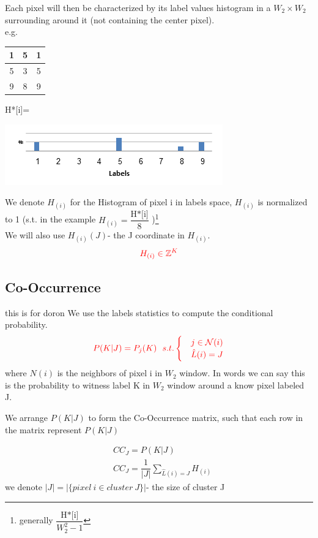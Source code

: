 \documentclass{article}
\begin{document}
Each pixel will then be characterized by its label values histogram in a $W_2\times W_2$ surrounding around it (not containing the center pixel).\\
e.g. 
\begin{multicols}{3}
\begin{tabular}{|c|c|c|}\hline
1&5&1\\	\hline
5&3&5\\ \hline
9&8&9\\ \hline
\end{tabular}

\begin{flushright}
	H*[i]=
\end{flushright}	
\includegraphics[width=0.9\linewidth]{histogram.png}
\end{multicols}
We denote $ H_{(i)} $ for the Histogram of pixel i in labels space, $ H_{(i)} $  is normalized to 1 (s.t. in the example $ H_{(i)} = \dfrac{\text{H*[i]}}{8}$ )\footnote{generally $\dfrac{\text{H*[i]}}{W_2^2-1}$ }\\
We will also use  $ H_{(i)}(J) $- the J coordinate in $ H_{(i)} $.
\begin{equation*}
\color{red} H_{(i)}\in \mathbb{Z}^K 
\end{equation*}
\subsection{Co-Occurrence}
this is for doron
We use the labels statistics to compute the conditional probability.
$$ \color{red}
 P(K|J)=P _j(K) \ \ s.t. \begin{cases}
&j \in {\mathcal{N}(i)}\\
&\hat{L}(i)=J
\end{cases}  $$
where $ N(i) $ is the neighbors of pixel i in $ W_2 $ window.
In words we can say this is the probability to witness label K in $ W_2 $ window around a know pixel labeled J.

We arrange $ P(K|J) $ to form the Co-Occurrence matrix, such that each row in the matrix represent $ P(K|J) $

\begin{align}
&CC_J= P(K|J)\label{eq:CoOc}\\
&CC_J=\dfrac{1}{|J|} \sum_{\hat{L}(i)=J}H_{(i)}\nonumber
\end{align}
we denote $ |J|=|\{pixel\ i\in cluster\ J\}| $- the size of cluster J
\end{document}
